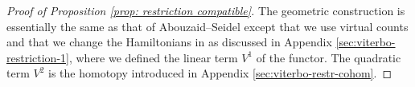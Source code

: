\documentclass{article}
\DeclareMathOperator{\Mod}{mod}\DeclareMathOperator{\supp}{supp}\DeclareMathOperator{\obj}{obj}
\theoremstyle{plain}%
\theoremstyle{definition}
\numberwithin{equation}{section}
\numberwithin{figure}{section}
\def\eq{\eqref}
\def\cF{{\mathbin{\cal F}}}
\def\cW{{\mathbin{\cal W}}}
\def\-{\setminus}
\def\iy{\infty}
\begin{document}
\begin{proof}[Proof of Proposition \ref{prop: restriction compatible}]
    
The geometric construction is essentially the same as that of Abouzaid--Seidel \cite[\S4]{AS} except that we use virtual counts and that we change the  Hamiltonians in \cite[\S4.2]{AS} as discussed in Appendix \ref{sec:viterbo-restriction-1}, where we defined the linear term $V^1$ of the functor. The quadratic term $V^2$ is the homotopy introduced in Appendix \ref{sec:viterbo-restr-cohom}.







\end{proof}
\end{document}
